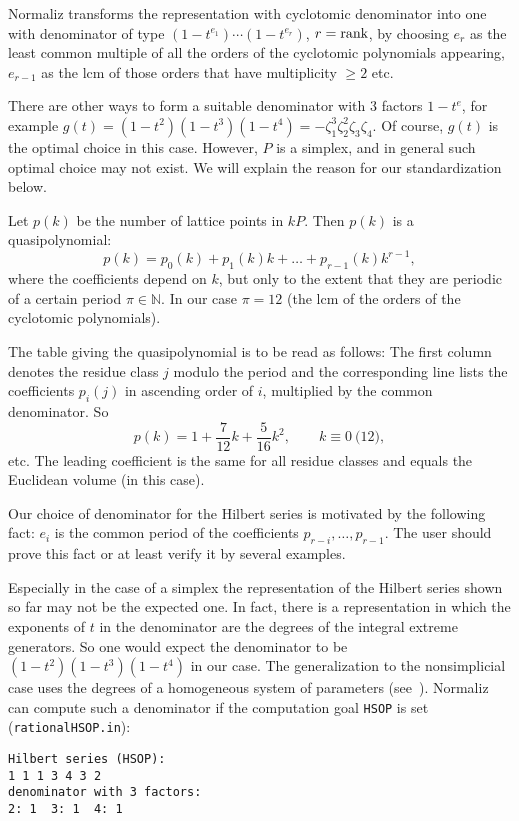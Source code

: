 \documentclass[12pt,a4paper]{scrartcl}
\theoremstyle{definition}
\def\NN{{\mathbb N}}
\begin{document}
Normaliz transforms the representation with cyclotomic
denominator into one with denominator of type
$(1-t^{e_1})\cdots(1-t^{e_r})$, $r=\textup{rank}$, by choosing
$e_r$ as the least common multiple of all the orders of the
cyclotomic polynomials appearing, $e_{r-1}$ as the lcm of those
orders that have multiplicity $\ge 2$ etc.

There are other ways to form a suitable denominator with $3$
factors $1-t^e$, for example
$g(t)=(1-t^2)(1-t^3)(1-t^4)=-\zeta_1^3\zeta_2^2\zeta_3\zeta_4$.
Of course, $g(t)$ is the optimal choice in this case. However,
$P$ is a simplex, and in general such optimal choice may not
exist. We will explain the reason for our standardization
below.

Let $p(k)$ be the number of lattice points in $kP$. Then $p(k)$
is a quasipolynomial:
$$
p(k)=p_0(k)+p_1(k)k+\dots+p_{r-1}(k)k^{r-1},
$$
where the coefficients depend on $k$, but only to the extent
that they are periodic of a certain period $\pi\in\NN$. In our
case $\pi=12$ (the lcm of the orders of the cyclotomic
polynomials).

The table giving the quasipolynomial is to be read as follows:
The first column denotes the residue class $j$ modulo the
period and the corresponding line lists the coefficients
$p_i(j)$ in ascending order of $i$, multiplied by the common
denominator. So
$$
p(k)=1+\frac{7}{12}k+\frac{5}{16}k^2, \qquad k\equiv 0\pod{12},
$$
etc. The leading coefficient is the same for all residue
classes and equals the Euclidean volume (in this case).

Our choice of denominator for the Hilbert series is motivated
by the following fact: $e_i$ is the common period of the
coefficients $p_{r-i},\dots,p_{r-1}$. The user should prove
this fact or at least verify it by several examples.

Especially in the case of a simplex the representation of the Hilbert series shown so far may not be the expected one. In fact, there is a representation in which the exponents of $t$ in the denominator are the degrees of the integral extreme generators. So one would expect the denominator to be $(1-t^2)(1-t^3)(1-t^4)$ in our case. The generalization to the nonsimplicial case uses the degrees of a homogeneous system of parameters (see~\cite[p.~200]{BG}). Normaliz can compute such a denominator if the computation goal \verb|HSOP| is set (\verb|rationalHSOP.in|):
\begin{Verbatim}
Hilbert series (HSOP):
1 1 1 3 4 3 2 
denominator with 3 factors:
2: 1  3: 1  4: 1 
\end{Verbatim}
\end{document}
